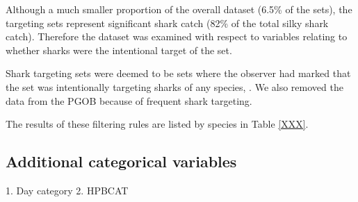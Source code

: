 \documentclass{SCreport}
\begin{document}
Although a much smaller proportion of the overall dataset (6.5\% of the sets), the targeting sets represent significant shark catch (82\% of the total silky shark catch). Therefore the dataset was examined with respect to variables relating to whether sharks were the intentional target of the set. 

Shark targeting sets were deemed to be sets where the observer had marked that the set was intentionally targeting sharks of any species, . We also removed the data from the PGOB because of frequent shark targeting. 

The results of these filtering rules are listed by species in Table \ref{XXX}.

\subsection{Additional categorical variables}
1. Day category
2. HPBCAT

\end{document}
